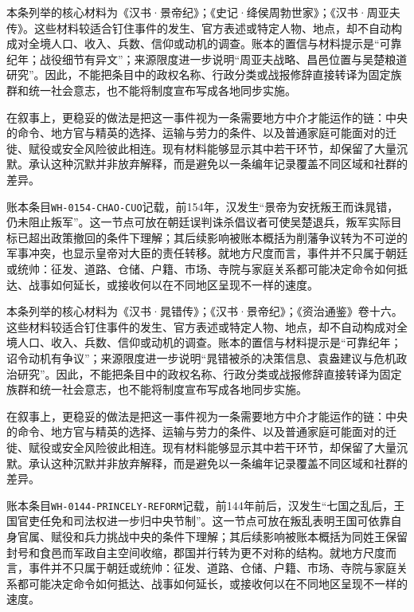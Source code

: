 本条列举的核心材料为《汉书·景帝纪》；《史记·绛侯周勃世家》；《汉书·周亚夫传》。这些材料较适合钉住事件的发生、官方表述或特定人物、地点，却不自动构成对全境人口、收入、兵数、信仰或动机的调查。账本的置信与材料提示是“可靠纪年；战役细节有异文”；来源限度进一步说明“周亚夫战略、昌邑位置与吴楚粮道研究”。因此，不能把条目中的政权名称、行政分类或战报修辞直接转译为固定族群和统一社会意志，也不能将制度宣布写成各地同步实施。

在叙事上，更稳妥的做法是把这一事件视为一条需要地方中介才能运作的链：中央的命令、地方官与精英的选择、运输与劳力的条件、以及普通家庭可能面对的迁徙、赋役或安全风险彼此相连。现有材料能够显示其中若干环节，却保留了大量沉默。承认这种沉默并非放弃解释，而是避免以一条编年记录覆盖不同区域和社群的差异。

账本条目\texttt{WH-0154-CHAO-CUO}记载，前154年，汉发生“景帝为安抚叛王而诛晁错，仍未阻止叛军”。这一节点可放在朝廷误判诛杀倡议者可使吴楚退兵，叛军实际目标已超出政策撤回的条件下理解；其后续影响被账本概括为削藩争议转为不可逆的军事冲突，也显示皇帝对大臣的责任转移。就地方尺度而言，事件并不只属于朝廷或统帅：征发、道路、仓储、户籍、市场、寺院与家庭关系都可能决定命令如何抵达、战事如何延长，或接收何以在不同地区呈现不一样的速度。

本条列举的核心材料为《汉书·晁错传》；《汉书·景帝纪》；《资治通鉴》卷十六。这些材料较适合钉住事件的发生、官方表述或特定人物、地点，却不自动构成对全境人口、收入、兵数、信仰或动机的调查。账本的置信与材料提示是“可靠纪年；诏令动机有争议”；来源限度进一步说明“晁错被杀的决策信息、袁盎建议与危机政治研究”。因此，不能把条目中的政权名称、行政分类或战报修辞直接转译为固定族群和统一社会意志，也不能将制度宣布写成各地同步实施。

在叙事上，更稳妥的做法是把这一事件视为一条需要地方中介才能运作的链：中央的命令、地方官与精英的选择、运输与劳力的条件、以及普通家庭可能面对的迁徙、赋役或安全风险彼此相连。现有材料能够显示其中若干环节，却保留了大量沉默。承认这种沉默并非放弃解释，而是避免以一条编年记录覆盖不同区域和社群的差异。

账本条目\texttt{WH-0144-PRINCELY-REFORM}记载，前144年前后，汉发生“七国之乱后，王国官吏任免和司法权进一步归中央节制”。这一节点可放在叛乱表明王国可依靠自身官属、赋役和兵力挑战中央的条件下理解；其后续影响被账本概括为同姓王保留封号和食邑而军政自主空间收缩，郡国并行转为更不对称的结构。就地方尺度而言，事件并不只属于朝廷或统帅：征发、道路、仓储、户籍、市场、寺院与家庭关系都可能决定命令如何抵达、战事如何延长，或接收何以在不同地区呈现不一样的速度。

